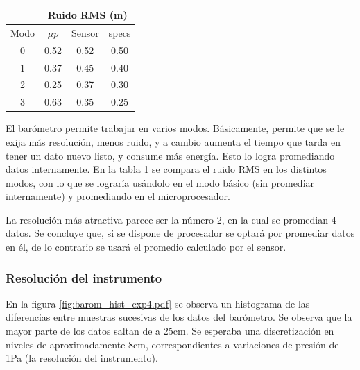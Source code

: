 \documentclass[main]{subfiles}
\begin{document}
\begin{table}
\vspace{-40pt}
\centering
\begin{tabular}{c|c|c|c|} 
\cline{2-4}
	& \multicolumn{3}{|c|}{\cellcolor[gray]{0.8} Ruido RMS  (m)}      \\ \hline
\multicolumn{1}{|c|}{\cellcolor[gray]{0.8} {Modo}} & \cellcolor[gray]{0.8} {$\mu p$} &\cellcolor[gray]{0.8} {Sensor} &\cellcolor[gray]{0.8} {specs}\\ \hline

\multicolumn{1}{|c|}{0}	&	0.52	&	0.52	&	0.50\\
\hline
\multicolumn{1}{|c|}{1}	&	0.37	&	0.45	&	0.40\\
\hline
\multicolumn{1}{|c|}{2}	&	0.25	&	0.37	&	0.30\\
\hline
\multicolumn{1}{|c|}{3}	&	0.63	&	0.35	&	0.25\\
\hline

\end{tabular}
\caption{}
\vspace{-15pt}
\label{tab:ruido-rms}
\end{table}

El barómetro permite trabajar en varios modos. Básicamente, permite que se le exija más resolución, menos ruido, y a cambio aumenta el tiempo que tarda en tener un dato nuevo listo, y consume más energía. Esto lo logra promediando datos internamente. En la tabla \ref{tab:ruido-rms} se compara el ruido RMS en los distintos modos, con lo que se lograría usándolo en el modo básico (sin promediar internamente) y promediando en el microprocesador.

La resolución más atractiva parece ser la número 2, en la cual se promedian 4 datos. Se concluye que, si se dispone de procesador se optará por promediar datos en él, de lo contrario se usará el promedio calculado por el sensor.

\newpage
\subsubsection{Resolución del instrumento}

En la figura \ref{fig:barom_hist_exp4.pdf} se observa un histograma de las diferencias entre muestras sucesivas de los datos del barómetro. Se observa que la mayor parte de los datos saltan de a 25cm. Se esperaba una discretización en niveles de  aproximadamente 8cm, correspondientes a variaciones de presión de 1Pa (la resolución del instrumento).
\end{document}
